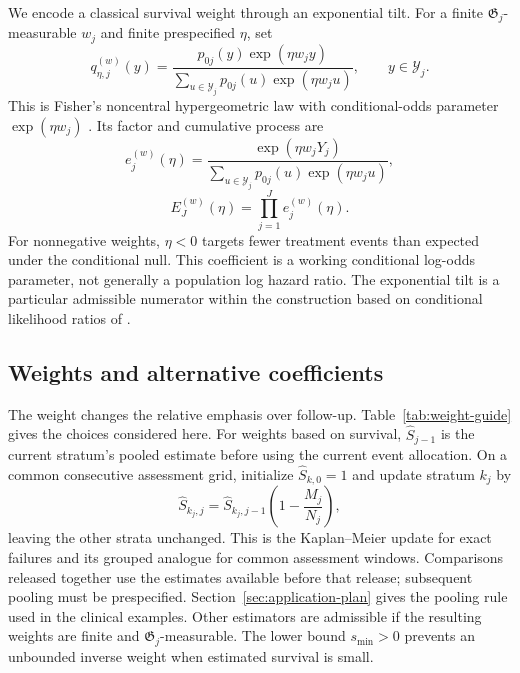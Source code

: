 \documentclass[12pt]{article}
\theoremstyle{definition}
\theoremstyle{remark}
\begin{document}
We encode a classical survival weight through an exponential tilt. For a finite $\mathfrak G_j$-measurable $w_j$ and finite prespecified $\eta$, set
\begin{equation}
 q_{\eta,j}^{(w)}(y)=
 \frac{p_{0j}(y)\exp(\eta w_jy)}
 {\displaystyle\sum_{u\in\mathcal Y_j}p_{0j}(u)\exp(\eta w_ju)},
 \qquad y\in\mathcal Y_j.
 \label{eq:tilted-pmf}
\end{equation}
This is Fisher's noncentral hypergeometric law with conditional-odds parameter $\exp(\eta w_j)$ \citep{Fog2008}. Its factor and cumulative process are
\begin{equation}
 e_j^{(w)}(\eta)=
 \frac{\exp(\eta w_jY_j)}
 {\displaystyle\sum_{u\in\mathcal Y_j}p_{0j}(u)\exp(\eta w_ju)},
 \label{eq:weighted-factor}
\end{equation}
\begin{equation}
 E_J^{(w)}(\eta)=\prod_{j=1}^J e_j^{(w)}(\eta).
 \label{eq:expanded-eprocess}
\end{equation}
For nonnegative weights, $\eta<0$ targets fewer treatment events than expected under the conditional null. This coefficient is a working conditional log-odds parameter, not generally a population log hazard ratio. The exponential tilt is a particular admissible numerator within the construction based on conditional likelihood ratios of \citet{TerSchureEtAl2024}.

\subsection{Weights and alternative coefficients}
\label{sec:weights}
\label{sec:coefficient-choice}

The weight changes the relative emphasis over follow-up. Table~\ref{tab:weight-guide} gives the choices considered here. For weights based on survival, $\widehat S_{j-1}$ is the current stratum's pooled estimate before using the current event allocation. On a common consecutive assessment grid, initialize $\widehat S_{k,0}=1$ and update stratum $k_j$ by
\begin{equation}
 \widehat S_{k_j,j}=\widehat S_{k_j,j-1}\left(1-\frac{M_j}{N_j}\right),
 \label{eq:pooled-product-limit}
\end{equation}
leaving the other strata unchanged. This is the Kaplan--Meier update for exact failures and its grouped analogue for common assessment windows. Comparisons released together use the estimates available before that release; subsequent pooling must be prespecified. Section~\ref{sec:application-plan} gives the pooling rule used in the clinical examples. Other estimators are admissible if the resulting weights are finite and $\mathfrak G_j$-measurable. The lower bound $s_{\min}>0$ prevents an unbounded inverse weight when estimated survival is small.
\end{document}
